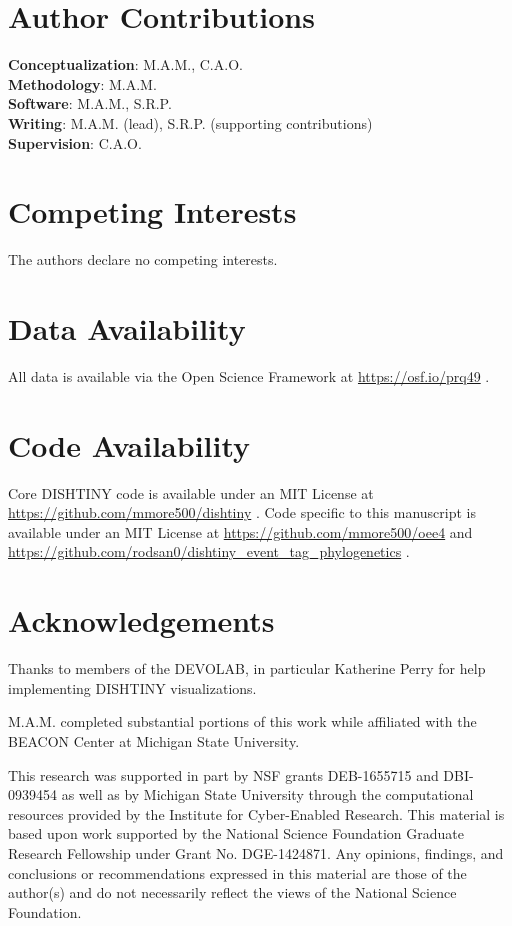 \section*{Author Contributions}

\textbf{Conceptualization}: M.A.M., C.A.O. \\
\textbf{Methodology}: M.A.M. \\
\textbf{Software}: M.A.M., S.R.P. \\
\textbf{Writing}: M.A.M. (lead), S.R.P. (supporting contributions) \\
\textbf{Supervision}: C.A.O.

\section*{Competing Interests}

The authors declare no competing interests.

\section*{Data Availability}

All data is available via the Open Science Framework at \url{https://osf.io/prq49} \citep{Moreno_Rodriguez_Papa_2022}.

\section*{Code Availability}

Core DISHTINY code is available under an MIT License at \url{https://github.com/mmore500/dishtiny} \citep{moreno_2025_16990564}.
Code specific to this manuscript is available under an MIT License at \url{https://github.com/mmore500/oee4} and \url{https://github.com/rodsan0/dishtiny_event_tag_phylogenetics} \citep{matthew_andres_moreno_2024_16990558,rodsan0_2025_16990704}.

\section*{Acknowledgements}

Thanks to members of the DEVOLAB, in particular Katherine Perry for help implementing DISHTINY visualizations.

M.A.M. completed substantial portions of this work while affiliated with the BEACON Center at Michigan State University.

This research was supported in part by NSF grants DEB-1655715 and DBI-0939454 as well as by Michigan State University through the computational resources provided by the Institute for Cyber-Enabled Research.
This material is based upon work supported by the National Science Foundation Graduate Research Fellowship under Grant No. DGE-1424871.
Any opinions, findings, and conclusions or recommendations expressed in this material are those of the author(s) and do not necessarily reflect the views of the National Science Foundation.

